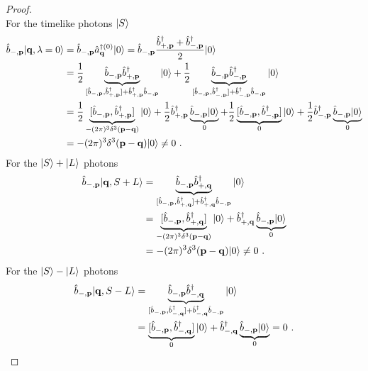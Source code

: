 \begin{proof}
\begin{equation*}
        \end{equation*}
        For the timelike photons $\vert S\rangle$
        \begin{equation*}
        \begin{aligned}
            \hat b_{-, \mathbf p} \vert\mathbf q, \lambda=0\rangle & = \hat b_{-, \mathbf p} \hat a_{\mathbf q}^{\dagger (0)} \vert0\rangle = \hat b_{-, \mathbf p} \frac{\hat b^\dagger_{+, \mathbf p} + \hat b^\dagger_{-, \mathbf p}}{2} \vert0\rangle \\ &  = \frac{1}{2} \underbrace{\hat b_{-, \mathbf p} \hat b^\dagger_{+, \mathbf p}}_{[\hat b_{-, \mathbf p} ,\hat b^\dagger_{+, \mathbf p}] + \hat b^\dagger_{+, \mathbf p} \hat b_{-, \mathbf p} } \vert0\rangle + \frac{1}{2} \underbrace{\hat b_{-, \mathbf p} \hat b^\dagger_{-, \mathbf p}}_{[\hat b_{-, \mathbf p}, \hat b^\dagger_{-, \mathbf p}] + \hat b^\dagger_{-, \mathbf p} \hat b_{-, \mathbf p}} \vert0\rangle \\ & = \frac{1}{2} \underbrace{[\hat b_{-, \mathbf p} ,\hat b^\dagger_{+, \mathbf p}]}_{- (2\pi)^3 \delta^3 (\mathbf p - \mathbf q)} \vert0\rangle + \frac{1}{2} \hat b^\dagger_{+, \mathbf p} \underbrace{\hat b_{-, \mathbf p} \vert0\rangle}_0 + \frac{1}{2} \underbrace{[\hat b_{-, \mathbf p}, \hat b^\dagger_{-, \mathbf p}]}_{0} \vert0\rangle + \frac{1}{2} \hat b^\dagger_{-, \mathbf p} \underbrace{\hat b_{-, \mathbf p} \vert0\rangle}_0 \\ & = - (2\pi)^3 \delta^3 (\mathbf p - \mathbf q) \vert0\rangle \neq 0 ~.
        \end{aligned}
        \end{equation*}
        For the $\vert S\rangle + \vert L\rangle$ photons
        \begin{equation*}
        \begin{aligned}
            \hat b_{-, \mathbf p} \vert\mathbf q, S + L\rangle & = \underbrace{\hat b_{-, \mathbf p} \hat b_{+,\mathbf q}^{\dagger}}_{[\hat b_{-, \mathbf p}, \hat b_{+,\mathbf q}^{\dagger}] + \hat b_{+,\mathbf q}^{\dagger} \hat b_{-, \mathbf p} } \vert0\rangle \\ & = \underbrace{[\hat b_{-, \mathbf p}, \hat b_{+,\mathbf q}^{\dagger}]}_{- (2\pi)^3 \delta^3 (\mathbf p -\mathbf q)} \vert0\rangle + \hat b_{+,\mathbf q}^{\dagger} \underbrace{\hat b_{-, \mathbf p} \vert0\rangle}_0 \\ & = - (2\pi)^3 \delta^3 (\mathbf p -\mathbf q) \vert0\rangle \neq 0 ~.
        \end{aligned}
        \end{equation*}
        For the $\vert S\rangle - \vert L\rangle$ photons
        \begin{equation*}
        \begin{aligned}
            \hat b_{-, \mathbf p} \vert\mathbf q, S - L\rangle & = \underbrace{\hat b_{-, \mathbf p} \hat b_{-,\mathbf q}^{\dagger}}_{[\hat b_{-, \mathbf p}, \hat b_{-,\mathbf q}^{\dagger}] + \hat b_{-,\mathbf q}^{\dagger} \hat b_{-, \mathbf p} } \vert0\rangle \\ & = \underbrace{[\hat b_{-, \mathbf p}, \hat b_{-,\mathbf q}^{\dagger}]}_{0} \vert0\rangle + \hat b_{-,\mathbf q}^{\dagger} \underbrace{\hat b_{-, \mathbf p} \vert0\rangle}_0 = 0 ~.
        \end{aligned}
        \end{equation*}
    \end{proof}

